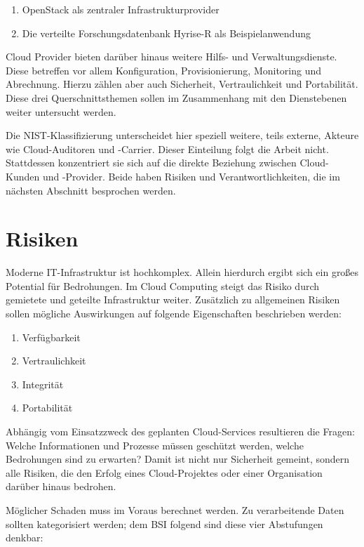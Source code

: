 \begin{enumerate}
	\item OpenStack als zentraler Infrastrukturprovider
	\item Die verteilte Forschungsdatenbank Hyrise-R als Beispielanwendung
\end{enumerate}

\noindent
Cloud Provider bieten darüber hinaus weitere Hilfs- und Verwaltungsdienste. Diese betreffen vor allem Konfiguration, Provisionierung, Monitoring und Abrechnung. Hierzu zählen aber auch Sicherheit, Vertraulichkeit und Portabilität. Diese drei Querschnittsthemen sollen im Zusammenhang mit den Dienstebenen weiter untersucht werden.

Die NIST-Klassifizierung unterscheidet hier speziell weitere, teils externe, Akteure wie Cloud-Auditoren und -Carrier. Dieser Einteilung folgt die Arbeit nicht. Stattdessen konzentriert sie sich auf die direkte Beziehung zwischen Cloud-Kunden und -Provider. Beide haben Risiken und Verantwortlichkeiten, die im nächsten Abschnitt besprochen werden.

\section{Risiken}

Moderne IT-Infrastruktur ist hochkomplex. Allein hierdurch ergibt sich ein großes Potential für Bedrohungen. Im Cloud Computing steigt das Risiko durch gemietete und geteilte Infrastruktur weiter. Zusätzlich zu allgemeinen Risiken sollen mögliche Auswirkungen auf folgende Eigenschaften beschrieben werden:

\begin{enumerate}
	\item Verfügbarkeit
	\item Vertraulichkeit
	\item Integrität
	\item Portabilität
\end{enumerate}

\noindent
Abhängig vom Einsatzzweck des geplanten Cloud-Services resultieren die Fragen: Welche Informationen und Prozesse müssen geschützt werden, welche Bedrohungen sind zu erwarten? Damit ist nicht nur Sicherheit gemeint, sondern alle Risiken, die den Erfolg eines Cloud-Projektes oder einer Organisation darüber hinaus bedrohen.

Möglicher Schaden muss im Voraus berechnet werden. Zu verarbeitende Daten sollten kategorisiert werden; dem BSI folgend sind diese vier Abstufungen denkbar:

